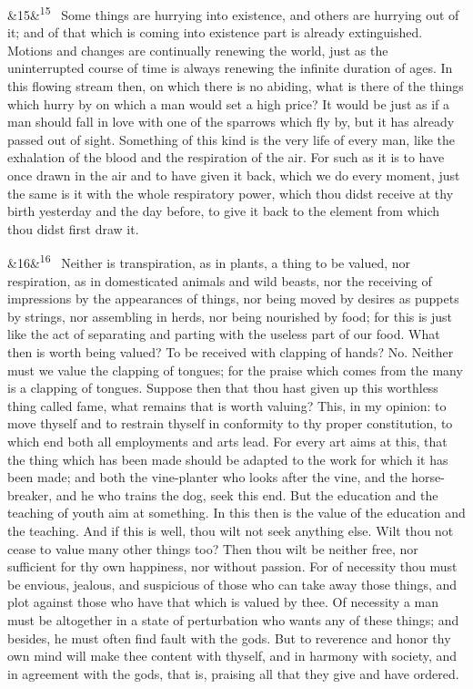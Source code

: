 \documentclass[12pt]{article}
\newcommand{\para}[1][]{\par\noindent\ifx&#1&\else\textsuperscript{\footnotesize #1}~\fi}
\begin{document}
\para[15] Some things are hurrying into existence, and others are hurrying out
of it; and of that which is coming into existence part is already
extinguished. Motions and changes are continually renewing the world,
just as the uninterrupted course of time is always renewing the infinite
duration of ages. In this flowing stream then, on which there is no
abiding, what is there of the things which hurry by on which a man would
set a high price? It would be just as if a man should fall in love with
one of the sparrows which fly by, but it has already passed out of
sight. Something of this kind is the very life of every man, like the
exhalation of the blood and the respiration of the air. For such as it
is to have once drawn in the air and to have given it back, which we do
every moment, just the same is it with the whole respiratory power,
which thou didst receive at thy birth yesterday and the day before, to
give it back to the element from which thou didst first draw it.

\para[16] Neither is transpiration, as in plants, a thing to be valued, nor
respiration, as in domesticated animals and wild beasts, nor the
receiving of impressions by the appearances of things, nor being moved
by desires as puppets by strings, nor assembling in herds, nor being
nourished by food; for this is just like the act of separating and
parting with the useless part of our food. What then is worth being
valued? To be received with clapping of hands? No. Neither must we value
the clapping of tongues; for the praise which comes from the many is a
clapping of tongues. Suppose then that thou hast given up this worthless
thing called fame, what remains that is worth valuing? This, in my
opinion: to move thyself and to restrain thyself in conformity to thy
proper constitution, to which end both all employments and arts lead.
For every art aims at this, that the thing which has been made should be
adapted to the work for which it has been made; and both the
vine-planter who looks after the vine, and the horse-breaker, and he who
trains the dog, seek this end. But the education and the teaching of
youth aim at something. In this then is the value of the education and
the teaching. And if this is well, thou wilt not seek anything else.
Wilt thou not cease to value many other things too? Then thou wilt be
neither free, nor sufficient for thy own happiness, nor without passion.
For of necessity thou must be envious, jealous, and suspicious of those
who can take away those things, and plot against those who have that
which is valued by thee. Of necessity a man must be altogether in a
state of perturbation who wants any of these things; and besides, he
must often find fault with the gods. But to reverence and honor thy own
mind will make thee content with thyself, and in harmony with society,
and in agreement with the gods, that is, praising all that they give and
have ordered.
\end{document}
